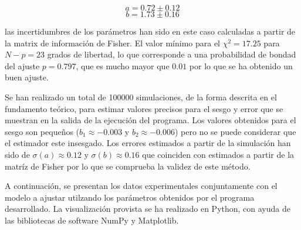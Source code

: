 \documentclass{article}
\begin{document}
\[ a = 0.72 \pm 0.12 \] \[ b = 1.73 \pm 0.16 \]

las incertidumbres de los parámetros han sido en este caso calculadas a
partir de la matrix de información de Fisher. El valor mínimo para el
\(\chi^2 = 17.25\) para \(N-p=23\) grados de libertad, lo que
corresponde a una probabilidad de bondad del ajuste \(p=0.797\), que es
mucho mayor que \(0.01\) por lo que se ha obtenido un buen ajuste.

Se han realizado un total de 100000 simulaciones, de la forma descrita
en el fundamento teórico, para estimar valores precisos para el sesgo y
error que se muestran en la salida de la ejecución del programa. Los
valores obtenidos para el sesgo son pequeños (\(b_1 \approx -0.003\) y
\(b_2 \approx -0.006\)) pero no se puede considerar que el estimador
este insesgado. Los errores estimados a partir de la simulación han sido
de \(\sigma(a) \approx 0.12\) y \(\sigma(b) \approx 0.16\) que coinciden
con estimados a partir de la matríz de Fisher por lo que se comprueba la
validez de este método.

    A continuación, se presentan los datos experimentales conjuntamente con
el modelo a ajustar utilzando los parámetros obtenidos por el programa
desarrollado. La visualización provista se ha realizado en Python, con
ayuda de las bibliotecas de software NumPy y Matplotlib.
\end{document}
